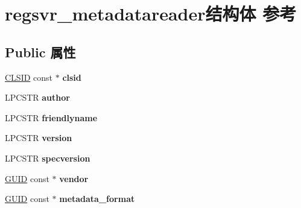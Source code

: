 \hypertarget{structregsvr__metadatareader}{}\section{regsvr\+\_\+metadatareader结构体 参考}
\label{structregsvr__metadatareader}
\subsection*{Public 属性}
\begin{DoxyCompactItemize}
\item 
\mbox{\label{structregsvr__metadatareader_ac31aa4ab2f4d9e50680a6ff7cc24ef0d}} 
\hyperlink{struct___i_i_d}{C\+L\+S\+ID} const  $\ast$ {\bfseries clsid}
\item 
\mbox{\label{structregsvr__metadatareader_a75f46cacb9f7a248e33a983ab296466c}} 
L\+P\+C\+S\+TR {\bfseries author}
\item 
\mbox{\label{structregsvr__metadatareader_a81a26a150ec89ef85733d416b0ac2e83}} 
L\+P\+C\+S\+TR {\bfseries friendlyname}
\item 
\mbox{\label{structregsvr__metadatareader_a379ff0af4c431a941b902acad096dc8d}} 
L\+P\+C\+S\+TR {\bfseries version}
\item 
\mbox{\label{structregsvr__metadatareader_a127904a605e30d817348c6bfc00f4d9f}} 
L\+P\+C\+S\+TR {\bfseries specversion}
\item 
\mbox{\label{structregsvr__metadatareader_a13311dc83d00d54f44944ad327f665a6}} 
\hyperlink{interface_g_u_i_d}{G\+U\+ID} const  $\ast$ {\bfseries vendor}
\item 
\mbox{\label{structregsvr__metadatareader_a454eb8bf461aac404e4bbaecb250c366}} 
\hyperlink{interface_g_u_i_d}{G\+U\+ID} const  $\ast$ {\bfseries metadata\+\_\+format}
\item 
\mbox{\label{structregsvr__metadatareader_a8e4c6f4905f6c69fc80afd98afa6e86f}} 

\end{DoxyCompactItemize}
